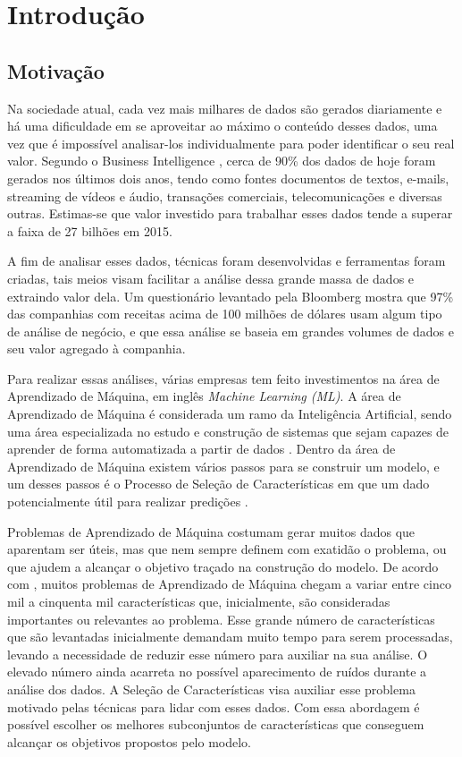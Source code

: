 \chapter[Introdução]{Introdução}


\section{Motivação}
Na sociedade atual, cada vez mais milhares de dados são gerados diariamente e há uma dificuldade em se aproveitar ao máximo o conteúdo desses dados, uma vez que é impossível analisar-los individualmente para poder identificar o seu real valor. Segundo o Business Intelligence , cerca de 90\% dos dados de hoje foram gerados nos últimos
dois anos, tendo como fontes documentos de textos, e-mails, streaming de vídeos e áudio, transações comerciais, telecomunicações e diversas outras. Estimas-se que valor investido para trabalhar esses dados tende a superar a faixa de 27 bilhões em 2015.

A fim de analisar esses dados, técnicas foram desenvolvidas e ferramentas foram criadas, tais meios visam facilitar a análise dessa grande massa de dados e extraindo valor dela. Um questionário levantado pela Bloomberg  mostra que 97\% das companhias com receitas acima de 100 milhões de dólares usam algum tipo de análise de negócio, e que essa análise se baseia em grandes volumes de dados e seu valor agregado à companhia.

Para realizar essas análises, várias empresas tem feito investimentos na área de Aprendizado de Máquina, em inglês \textit{Machine Learning (ML)}. A área de Aprendizado de Máquina é considerada um ramo da Inteligência Artificial, sendo uma área especializada no estudo e construção de sistemas que sejam capazes de aprender de forma automatizada a partir de dados \cite{brink2014}. Dentro da área de Aprendizado de Máquina existem vários passos para se construir um modelo, e um desses passos é o Processo de Seleção de Características em que um dado potencialmente útil para realizar predições \cite{mitchell_1997}. 

Problemas de Aprendizado de Máquina costumam gerar muitos dados que aparentam ser úteis, mas que nem sempre definem  com exatidão o problema, ou que ajudem a alcançar o objetivo traçado na construção do modelo. De acordo com , muitos problemas de Aprendizado de Máquina chegam a variar entre cinco mil a cinquenta mil características que, inicialmente, são consideradas importantes ou relevantes ao problema. Esse grande número de características que são levantadas inicialmente demandam muito tempo para serem processadas, levando a necessidade de reduzir esse número para auxiliar na sua análise. O elevado número ainda acarreta no possível aparecimento de ruídos durante a análise dos dados. A Seleção de Características visa auxiliar esse problema motivado pelas técnicas para lidar com esses dados. Com essa abordagem é possível escolher os melhores subconjuntos de características que conseguem alcançar os objetivos propostos pelo modelo. 

